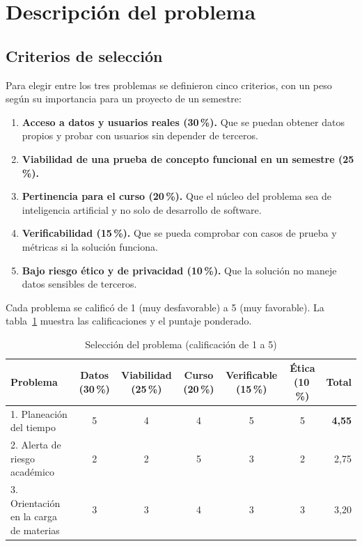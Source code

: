\section{Descripción del problema}\label{sec:seleccion}

\subsection{Criterios de selección}

Para elegir entre los tres problemas se definieron cinco criterios, con un peso según su importancia para un proyecto de un semestre:

\begin{enumerate}
    \item \textbf{Acceso a datos y usuarios reales (30\,\%).} Que se puedan obtener datos propios y probar con usuarios sin depender de terceros.
    \item \textbf{Viabilidad de una prueba de concepto funcional en un semestre (25\,\%).}
    \item \textbf{Pertinencia para el curso (20\,\%).} Que el núcleo del problema sea de inteligencia artificial y no solo de desarrollo de software.
    \item \textbf{Verificabilidad (15\,\%).} Que se pueda comprobar con casos de prueba y métricas si la solución funciona.
    \item \textbf{Bajo riesgo ético y de privacidad (10\,\%).} Que la solución no maneje datos sensibles de terceros.
\end{enumerate}

Cada problema se calificó de 1 (muy desfavorable) a 5 (muy favorable). La tabla~\ref{tab:seleccion} muestra las calificaciones y el puntaje ponderado.

\begin{table}[H]
\centering\footnotesize\setlength{\tabcolsep}{4pt}
\caption{Selección del problema (calificación de 1 a 5)}\label{tab:seleccion}
\begin{tabular}{lccccc r}
\toprule
Problema & Datos (30\,\%) & Viabilidad (25\,\%) & Curso (20\,\%) & Verificable (15\,\%) & Ética (10\,\%) & Total \\
\midrule
1. Planeación del tiempo & 5 & 4 & 4 & 5 & 5 & \textbf{4,55} \\
2. Alerta de riesgo académico & 2 & 2 & 5 & 3 & 2 & 2,75 \\
3. Orientación en la carga de materias & 3 & 3 & 4 & 3 & 3 & 3,20 \\
\bottomrule
\end{tabular}
\end{table}

